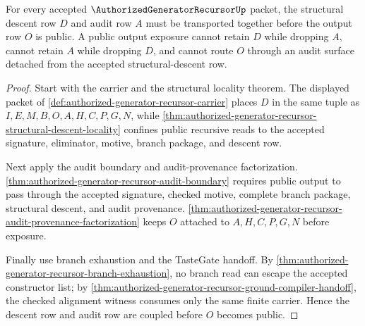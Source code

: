 \begin{theorem}
\label{thm:authorized-generator-recursor-root-descent-audit-coupling}
For every accepted $\AuthorizedGeneratorRecursorUp$ packet, the structural
descent row $D$ and audit row $A$ must be transported together before the
output row $O$ is public. A public output exposure cannot retain $D$ while
dropping $A$, cannot retain $A$ while dropping $D$, and cannot route $O$ through
an audit surface detached from the accepted structural-descent row.
\end{theorem}
\begin{proof}
Start with the carrier and the structural locality theorem. The displayed
packet of \autoref{def:authorized-generator-recursor-carrier} places $D$ in
the same tuple as $I,E,M,B,O,A,H,C,P,G,N$, while
\autoref{thm:authorized-generator-recursor-structural-descent-locality}
confines public recursive reads to the accepted signature, eliminator, motive,
branch package, and descent row.

Next apply the audit boundary and audit-provenance factorization.
\autoref{thm:authorized-generator-recursor-audit-boundary} requires public
output to pass through the accepted signature, checked motive, complete branch
package, structural descent, and audit provenance.
\autoref{thm:authorized-generator-recursor-audit-provenance-factorization}
keeps $O$ attached to $A,H,C,P,G,N$ before exposure.

Finally use branch exhaustion and the TasteGate handoff. By
\autoref{thm:authorized-generator-recursor-branch-exhaustion}, no branch read
can escape the accepted constructor list; by
\autoref{thm:authorized-generator-recursor-ground-compiler-handoff}, the
checked alignment witness consumes only the same finite carrier. Hence the
descent row and audit row are coupled before $O$ becomes public.
\end{proof}

